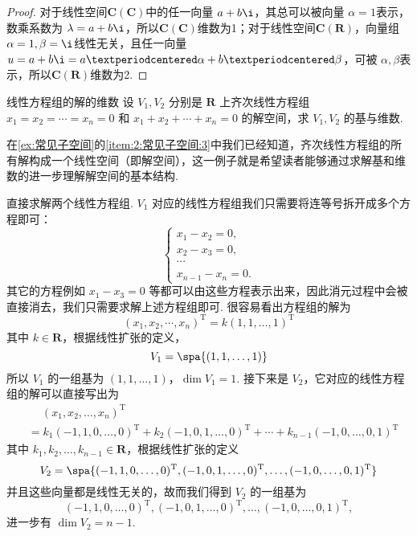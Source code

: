 \begin{proof}
    对于线性空间$\mathbf{C}(\mathbf{C})$中的任一向量 $a + b\i$，其总可以被向量 $\alpha = 1$表示，数乘系数为 $\lambda = a + b\i$，所以$\mathbf{C}(\mathbf{C})$维数为1；对于线性空间$\mathbf{C}(\mathbf{R})$，向量组 $\alpha = 1, \beta = \i$线性无关，且任一向量 $u = a + b\i = a·\alpha + b·\beta$，可被 $\alpha, \beta$表示，所以$\mathbf{C}(\mathbf{R})$维数为2.
\end{proof}

\begin{example}{}{线性方程组的解的维数}
    设 $V_1, V_2$ 分别是 $\mathbf{R}$ 上齐次线性方程组 $x_1 = x_2 = \cdots = x_n = 0$ 和 $x_1 + x_2 + \cdots + x_n = 0$ 的解空间，求 $V_1, V_2$ 的基与维数.
\end{example}

在\autoref{ex:常见子空间}的\ref{item:2:常见子空间:3}中我们已经知道，齐次线性方程组的所有解构成一个线性空间（即解空间），这一例子就是希望读者能够通过求解基和维数的进一步理解解空间的基本结构.

\begin{solution}
    直接求解两个线性方程组. $V_1$ 对应的线性方程组我们只需要将连等号拆开成多个方程即可：
    \[\begin{cases}
        x_1 - x_2 = 0, \\
        x_2 - x_3 = 0, \\
        \cdots \\
        x_{n-1} - x_n = 0.
    \end{cases}\]
    其它的方程例如 $x_1 - x_3 = 0$ 等都可以由这些方程表示出来，因此消元过程中会被直接消去，我们只需要求解上述方程组即可. 很容易看出方程组的解为
    \[(x_1,x_2,\cdots,x_n)^\mathrm{T} = k(1,1,\ldots,1)^\mathrm{T}\]
    其中 $k\in\mathbf{R}$，根据线性扩张的定义，
    \[V_1 = \spa\{(1,1,\ldots,1)\}\]
    所以 $V_1$ 的一组基为 $(1,1,\ldots,1)$，$\dim V_1 = 1$. 接下来是 $V_2$，它对应的线性方程组的解可以直接写出为
    \begin{align*}
        &\quad\ (x_1,x_2,\ldots,x_n)^\mathrm{T} \\
        &= k_1(-1,1,0,\ldots,0)^\mathrm{T} + k_2(-1,0,1,\ldots,0)^\mathrm{T} + \cdots + k_{n-1}(-1,0,\ldots,0,1)^\mathrm{T}
    \end{align*}
    其中 $k_1,k_2,\ldots,k_{n-1}\in\mathbf{R}$，根据线性扩张的定义
    \[V_2 = \spa\{(-1,1,0,\ldots,0)^\mathrm{T},(-1,0,1,\ldots,0)^\mathrm{T},\ldots,(-1,0,\ldots,0,1)^\mathrm{T}\}\]
    并且这些向量都是线性无关的，故而我们得到 $V_2$ 的一组基为
    \[(-1,1,0,\ldots,0)^\mathrm{T},(-1,0,1,\ldots,0)^\mathrm{T},\ldots,(-1,0,\ldots,0,1)^\mathrm{T},\]
    进一步有 $\dim V_2 = n - 1$.
\end{solution}

